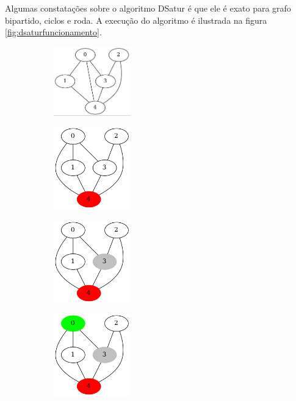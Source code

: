 \documentclass[12pt]{article}
\begin{document}
Algumas constatações sobre o algoritmo DSatur é que ele é exato para grafo bipartido, ciclos e roda. \cite{Lewis2016}
A execução do algoritmo é ilustrada na figura \ref{fig:dsaturfuncionamento}.

\begin{center}
\begin{figure}
\begin{subfigure}[b]{.33\linewidth}
\centering
\includegraphics[width=3.3cm]{DSaturFuncionamento1}
\end{subfigure}
\begin{subfigure}[b]{.33\linewidth}
\centering
\includegraphics[width=3.3cm]{DSaturFuncionamento2}
\end{subfigure}
\begin{subfigure}[b]{.33\linewidth}
\centering
\includegraphics[width=3.3cm]{DSaturFuncionamento3}
\end{subfigure}
\begin{subfigure}[b]{.33\linewidth}
\centering
\includegraphics[width=3.3cm]{DSaturFuncionamento4}
\end{subfigure}

\end{figure}
\end{center}
\end{document}
